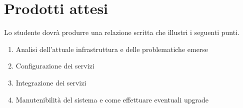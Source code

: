 \section*{Prodotti attesi}
Lo studente dovrà produrre una relazione scritta che illustri i seguenti punti.
\begin{enumerate}
    \item Analisi dell'attuale infrastruttura e delle problematiche emerse
    \item Configurazione dei servizi   
    \item Integrazione dei servizi    
    \item Manutenibilità del sistema e come effettuare eventuali upgrade
\end{enumerate}
